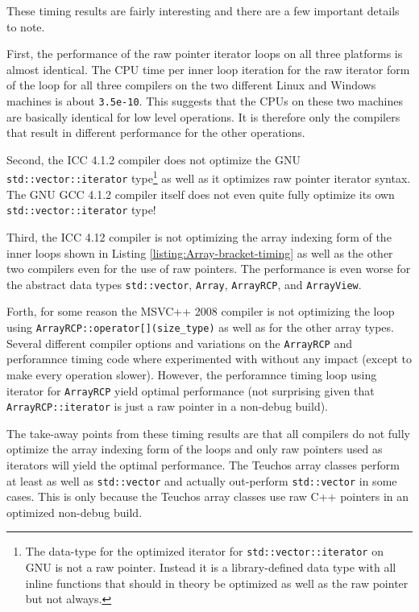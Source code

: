 \documentclass[pdf,ps2pdf,11pt]{SANDreport}
\begin{document}
These timing results are fairly interesting and there are a few
important details to note.

First, the performance of the raw pointer iterator loops on all three
platforms is almost identical.  The CPU time per inner loop iteration
for the raw iterator form of the loop for all three compilers on the
two different Linux and Windows machines is about {}\texttt{3.5e-10}.
This suggests that the CPUs on these two machines are basically
identical for low level operations.  It is therefore only the
compilers that result in different performance for the other
operations.

Second, the ICC 4.1.2 compiler does not optimize the GNU
{}\texttt{std::vector::iterator} type\footnote{The data-type for the
optimized iterator for {}\texttt{std::vector::iterator} on GNU is not
a raw pointer.  Instead it is a library-defined data type with all
inline functions that should in theory be optimized as well as the raw
pointer but not always.} as well as it optimizes raw pointer iterator
syntax.  The GNU GCC 4.1.2 compiler itself does not even quite fully
optimize its own {}\texttt{std::vector::iterator} type!

Third, the ICC 4.12 compiler is not optimizing the array indexing form
of the inner loops shown in Listing
{}\ref{listing:Array-bracket-timing} as well as the other two
compilers even for the use of raw pointers.  The performance is even
worse for the abstract data types {}\texttt{std::vector},
{}\texttt{Array}, {}\texttt{ArrayRCP}, and {}\texttt{ArrayView}.

Forth, for some reason the MSVC++ 2008 compiler is not optimizing the
loop using {}\texttt{ArrayRCP::operator[](size\_type)} as well as for
the other array types.  Several different compiler options and
variations on the {}\texttt{ArrayRCP} and perforamnce timing code
where experimented with without any impact (except to make every
operation slower).  However, the perforamnce timing loop using
iterator for {}\texttt{ArrayRCP} yield optimal performance (not
surprising given that {}\texttt{ArrayRCP::iterator} is just a raw
pointer in a non-debug build).

The take-away points from these timing results are that all compilers
do not fully optimize the array indexing form of the loops and only
raw pointers used as iterators will yield the optimal performance.
The Teuchos array classes perform at least as well as
{}\texttt{std::vector} and actually out-perform {}\texttt{std::vector}
in some cases.  This is only because the Teuchos array classes use raw
C++ pointers in an optimized non-debug build.
\end{document}
